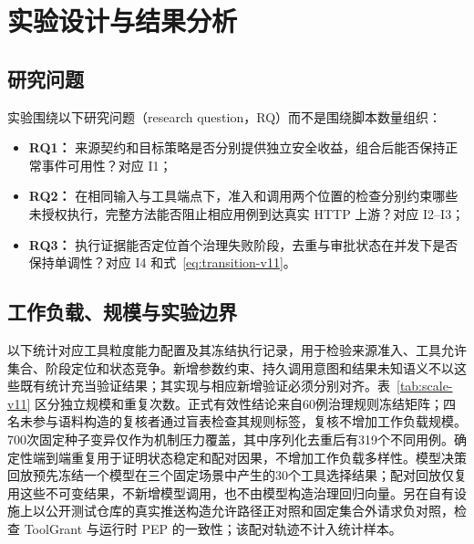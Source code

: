 \section{实验设计与结果分析}\label{sec:evaluation-v11}

\subsection{研究问题}

实验围绕以下研究问题（research question，RQ）而不是围绕脚本数量组织：
\begin{itemize}
  \item \textbf{RQ1：} 来源契约和目标策略是否分别提供独立安全收益，组合后能否保持正常事件可用性？对应 I1；
  \item \textbf{RQ2：} 在相同输入与工具端点下，准入和调用两个位置的检查分别约束哪些未授权执行，完整方法能否阻止相应用例到达真实 HTTP 上游？对应 I2--I3；
  \item \textbf{RQ3：} 执行证据能否定位首个治理失败阶段，去重与审批状态在并发下是否保持单调性？对应 I4 和式~\eqref{eq:transition-v11}。
\end{itemize}

\subsection{工作负载、规模与实验边界}

以下统计对应工具粒度能力配置及其冻结执行记录，用于检验来源准入、工具允许集合、阶段定位和状态竞争。新增参数约束、持久调用意图和结果未知语义不以这些既有统计充当验证结果；其实现与相应新增验证必须分别对齐。表~\ref{tab:scale-v11} 区分独立规模和重复次数。正式有效性结论来自60例治理规则冻结矩阵；四名未参与语料构造的复核者通过盲表检查其规则标签，复核不增加工作负载规模。700次固定种子变异仅作为机制压力覆盖，其中序列化去重后有319个不同用例。确定性端到端重复用于证明状态稳定和配对因果，不增加工作负载多样性。模型决策回放预先冻结一个模型在三个固定场景中产生的30个工具选择结果；配对回放仅复用这些不可变结果，不新增模型调用，也不由模型构造治理回归向量。另在自有设施上以公开测试仓库的真实推送构造允许路径正对照和固定集合外请求负对照，检查 ToolGrant 与运行时 PEP 的一致性；该配对轨迹不计入统计样本。

